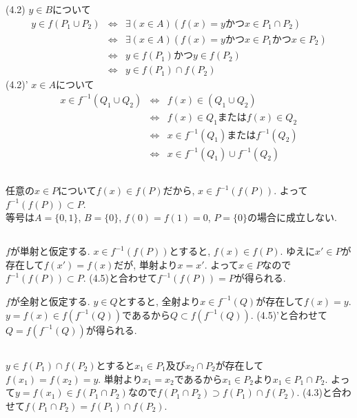 \documentclass{jsarticle}
\begin{document}
\subsection{} %
\noindent
(4.2) $y \in B$について
\begin{eqnarray*}
	y \in f(P_1 \cup P_2)
	&\Leftrightarrow& \exists(x \in A)(f(x) = yかつx \in P_1 \cap P_2)\\
	&\Leftrightarrow& \exists(x \in A)(f(x) = yかつx \in P_1 かつ x \in P_2)\\
	&\Leftrightarrow& y \in f(P_1) かつ y \in f(P_2)\\
	&\Leftrightarrow& y \in f(P_1) \cap f(P_2)
\end{eqnarray*}
(4.2)' $x \in A$について
\begin{eqnarray*}
	x \in f^{-1}(Q_1 \cup Q_2)
	&\Leftrightarrow& f(x) \in (Q_1 \cup Q_2)\\
	&\Leftrightarrow& f(x) \in Q_1 または f(x) \in Q_2\\
	&\Leftrightarrow& x \in f^{-1}(Q_1) または f^{-1}(Q_2)\\
	&\Leftrightarrow& x \in f^{-1}(Q_1) \cup f^{-1}(Q_2)
\end{eqnarray*}

\subsection{} %
任意の$x \in P$について$f(x) \in f(P)$だから, $x \in f^{-1}(f(P))$. よって$f^{-1}(f(P)) \subset P$.\\
等号は$A = \{0, 1\}$, $B = \{0\}$, $f(0) = f(1) = 0$, $P = \{0\}$の場合に成立しない.

\subsection{} %
$f$が単射と仮定する. $x \in f^{-1}(f(P))$とすると, $f(x) \in f(P)$. ゆえに$x' \in P$が存在して$f(x') = f(x)$だが, 単射より$x = x'$. よって$x \in P$なので$f^{-1}(f(P)) \subset P$. (4.5)と合わせて$f^{-1}(f(P)) = P$が得られる.

$f$が全射と仮定する. $y \in Q$とすると, 全射より$x \in f^{-1}(Q)$が存在して$f(x) = y$. $y = f(x) \in f(f^{-1}(Q))$であるから$Q \subset f(f^{-1}(Q))$. (4.5)'と合わせて$Q = f(f^{-1}(Q))$が得られる.

\subsection{} %
$y \in f(P_1) \cap f(P_2)$とすると$x_1 \in P_1$及び$x_2 \cap P_2$が存在して$f(x_1) = f(x_2) = y$. 単射より$x_1 = x_2$であるから$x_1 \in P_2$より$x_1 \in P_1 \cap P_2$. よって$y = f(x_1) \in f(P_1 \cap P_2)$なので$f(P_1 \cap P_2) \supset f(P_1) \cap f(P_2)$. (4.3)と合わせて$f(P_1 \cap P_2) = f(P_1) \cap f(P_2)$.
\end{document}
